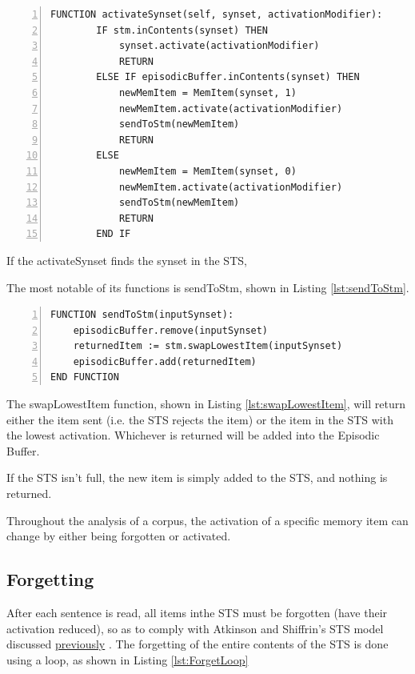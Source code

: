 \documentclass[]{article}
\begin{document}
\begin{lstlisting}[numbers=left, numberstyle=\small, caption={the activateSynset function}, captionpos=b, label={lst:activateSynset}]
FUNCTION activateSynset(self, synset, activationModifier):
        IF stm.inContents(synset) THEN
            synset.activate(activationModifier)
            RETURN
        ELSE IF episodicBuffer.inContents(synset) THEN
            newMemItem = MemItem(synset, 1)
            newMemItem.activate(activationModifier)
            sendToStm(newMemItem)
            RETURN
        ELSE
            newMemItem = MemItem(synset, 0)
            newMemItem.activate(activationModifier)
            sendToStm(newMemItem)
            RETURN
        END IF
\end{lstlisting}

If the activateSynset finds the synset in the STS, 

 The most notable of its functions is sendToStm, shown in Listing \ref{lst:sendToStm}.

\begin{lstlisting}[numbers=left, numberstyle=\small, caption={the sendToStm function}, captionpos=b, label={lst:sendToStm}]
FUNCTION sendToStm(inputSynset):
	episodicBuffer.remove(inputSynset)
	returnedItem := stm.swapLowestItem(inputSynset)
	episodicBuffer.add(returnedItem)
END FUNCTION
\end{lstlisting}

The swapLowestItem function, shown in Listing \ref{lst:swapLowestItem}, will return either the item sent (i.e. the STS rejects the item) or the item in the STS with the lowest activation. Whichever is returned will be added into the Episodic Buffer.

If the STS isn't full, the new item is simply added to the STS, and nothing is returned.

Throughout the analysis of a corpus, the activation of a specific memory item can change by either being forgotten or activated.

\subsection{Forgetting}
\label{sec:forgetting}
After each sentence is read, all items inthe STS must be forgotten (have their activation reduced), so as to comply with Atkinson and Shiffrin's STS model discussed \hyperref[ShortTerm]{previously} \cite{ControlProcessesSTMAtkinson}. The forgetting of the entire contents of the STS is done using a loop, as shown in Listing \ref{lst:ForgetLoop}
\end{document}

